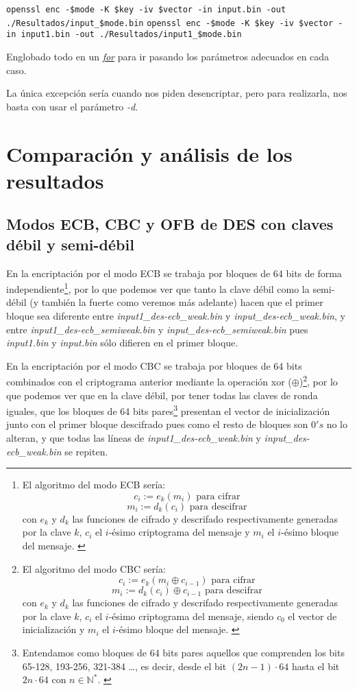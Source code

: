 \documentclass[a4paper, 11pt]{article}
\begin{document}
		\begin{small}
			\verb|openssl enc -$mode -K $key -iv $vector -in input.bin -out ./Resultados/input_$mode.bin|
			\verb|openssl enc -$mode -K $key -iv $vector -in input1.bin -out ./Resultados/input1_$mode.bin|
		\end{small}
		
		Englobado todo en un \href{http://manpages.ubuntu.com/manpages/zesty/en/man3/for.3tcl.html}{\textit{for}} para ir
		pasando los parámetros adecuados en cada caso.
		
		La única excepción sería cuando nos piden desencriptar, pero para realizarla, nos basta con usar el parámetro \textit{-d}.
	
\section{Comparación y análisis de los resultados}
	\subsection{Modos ECB, CBC y OFB de DES con claves débil y semi-débil}
		En la encriptación por el modo ECB se trabaja por bloques de 64 bits de forma independiente\footnote{El algoritmo del
		modo ECB sería: \[c_i := e_k(m_i) \text{ para cifrar}\] \[m_i := d_k(c_i) \text{ para descifrar}\] con $e_k$ y $d_k$
		las funciones de cifrado y descrifado respectivamente generadas por la clave $k$, $c_i$ el $i$-ésimo criptograma del
		mensaje y $m_i$ el $i$-ésimo bloque del mensaje. \label{ecb}}, por lo que podemos ver que tanto la clave débil como
		la semi-débil (y también la fuerte como veremos más adelante) hacen que el primer bloque sea diferente entre
		\textit{input1\_des-ecb\_weak.bin} y \textit{input\_des-ecb\_weak.bin}, y entre \textit{input1\_des-ecb\_semiweak.bin}
		y \textit{input\_des-ecb\_semiweak.bin} pues \textit{input1.bin} y \textit{input.bin} sólo difieren en el primer
		bloque.
		
		En la encriptación por el modo CBC se trabaja por bloques de 64 bits combinados con el criptograma anterior mediante la
		operación xor ($\oplus$)\footnote{El algoritmo del modo CBC sería: \[c_i := e_k(m_i \oplus c_{i-1})\text{ para cifrar}\]
		\[m_i := d_k(c_i) \oplus c_{i-1} \text{ para descifrar}\] con $e_k$ y $d_k$ las funciones de cifrado y descrifado
		respectivamente generadas por la clave $k$, $c_i$ el $i$-ésimo criptograma del mensaje, siendo $c_0$ el vector de
		inicialización y $m_i$ el $i$-ésimo bloque del mensaje. \label{cbc}}, por lo que podemos ver que en la clave débil, por
		tener todas las claves de ronda iguales, que los bloques de 64 bits pares\footnote{Entendamos como bloques de 64 bits
		pares aquellos que comprenden los bits 65-128, 193-256, 321-384 \dots, es decir, desde el bit $(2n-1) \cdot 64$ hasta
		el bit $2n \cdot 64$ con $n \in \mathbb{N}^*$. \label{bits-parity}} presentan el vector de inicialización junto con
		el primer bloque descifrado pues como el resto de bloques son $0's$ no lo alteran, y que todas las líneas de
		\textit{input1\_des-ecb\_weak.bin} y \textit{input\_des-ecb\_weak.bin} se repiten.
\end{document}
